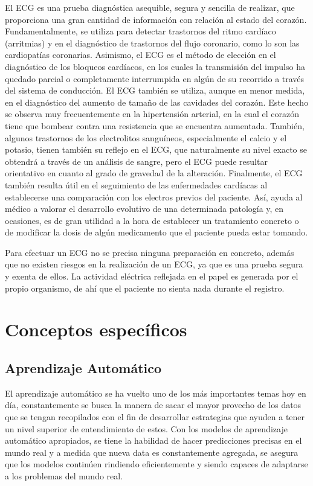 \documentclass[spanish,11pt,letterpaper,oneside]{memoir}
\begin{document}
El ECG es una prueba diagnóstica asequible, segura y sencilla de realizar, que proporciona una gran cantidad de información con relación al estado del corazón. Fundamentalmente, se utiliza para detectar trastornos del ritmo cardíaco (arritmias) y en el diagnóstico de trastornos del flujo coronario, como lo son las cardiopatías coronarias. Asimismo, el ECG es el método de elección en el diagnóstico de los bloqueos cardíacos, en los cuales la transmisión del impulso ha quedado parcial o completamente interrumpida en algún de su recorrido a través del sistema de conducción. El ECG también se utiliza, aunque en menor medida, en el diagnóstico del aumento de tamaño de las cavidades del corazón. Este hecho se observa muy frecuentemente en la hipertensión arterial, en la cual el corazón tiene que bombear contra una resistencia que se encuentra aumentada. También, algunos trastornos de los electrolitos sanguíneos, especialmente el calcio y el potasio, tienen también su reflejo en el ECG, que naturalmente su nivel exacto se obtendrá a través de un análisis de sangre, pero el ECG puede resultar orientativo en cuanto al grado de gravedad de la alteración. Finalmente, el ECG también resulta útil en el seguimiento de las enfermedades cardíacas al establecerse una comparación con los electros previos del paciente. Así, ayuda al médico a valorar el desarrollo evolutivo de una determinada patología y, en ocasiones, es de gran utilidad a la hora de establecer un tratamiento concreto o de modificar la dosis de algún medicamento que el paciente pueda estar tomando. 

Para efectuar un ECG no se precisa ninguna preparación en concreto, además que no existen riesgos en la realización de un ECG, ya que es una prueba segura y exenta de ellos. La actividad eléctrica reflejada en el papel es generada por el propio organismo, de ahí que el paciente no sienta nada durante el registro. 

\section{Conceptos específicos}

\subsection{Aprendizaje Automático}
	El aprendizaje automático se ha vuelto uno de los más importantes temas hoy en día, constantemente se busca la manera de sacar el mayor provecho de los datos que se tengan recopilados con el fin de desarrollar estrategias que ayuden a tener un nivel superior de entendimiento de estos. Con los modelos de aprendizaje automático apropiados, se tiene la habilidad de hacer predicciones precisas en el mundo real y a medida que nueva data es constantemente agregada, se asegura que los modelos continúen rindiendo eficientemente y siendo capaces de adaptarse a los problemas del mundo real. 
\end{document}
